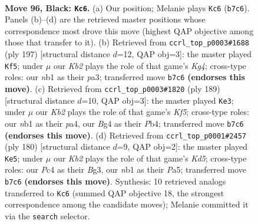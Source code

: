 \documentclass[11pt]{article}
\begin{document}
\clearpage

\begin{figure}[p]\centering
\begin{subfigure}{0.46\textwidth}\centering
\resizebox{\linewidth}{!}{%
\newchessgame
\chessboard[
  setfen={8/1k6/8/8/p1p3b1/6B1/5K2/1N6 b - - 47 96},
  showmover=false,
  pgfstyle=straightmove, color=movearrow, markmove={b7-c6}
]}
\caption{}
\end{subfigure}\hfill
\begin{subfigure}{0.46\textwidth}\centering
\resizebox{\linewidth}{!}{%
\newchessgame
\chessboard[
  setfen={8/8/3K4/p3B1k1/p7/P7/8/8 b - - 75 99},
  showmover=false,
  pgfstyle=straightmove, color=movearrow, markmove={g5-f5}
]}
\caption{}
\end{subfigure}
\\[4pt]
\begin{subfigure}{0.46\textwidth}\centering
\resizebox{\linewidth}{!}{%
\newchessgame
\chessboard[
  setfen={8/8/8/p7/Pp3k2/8/2K5/3B4 b - - 44 95},
  showmover=false,
  pgfstyle=straightmove, color=movearrow, markmove={f4-e3}
]}
\caption{}
\end{subfigure}\hfill
\begin{subfigure}{0.46\textwidth}\centering
\resizebox{\linewidth}{!}{%
\newchessgame
\chessboard[
  setfen={4b3/5k2/p4P2/P2K4/8/6B1/8/8 w - - 71 91},
  showmover=false,
  pgfstyle=straightmove, color=movearrow, markmove={d5-e5}
]}
\caption{}
\end{subfigure}
\caption{\textbf{Move 96, Black: \texttt{Kc6}.} (a) Our position; Melanie plays \texttt{Kc6} (\texttt{b7c6}). Panels (b)--(d) are the retrieved master positions whose correspondence most drove this move (highest QAP objective among those that transfer to it). (b) Retrieved from \texttt{ccrl\_top\_p0003\#1688} (ply 197) [structural distance $d$=12, QAP obj=3]: the master played \texttt{Kf5}; under $\mu$ our \emph{Kb2} plays the role of that game's \emph{Kg4}; cross-type roles: our \emph{n}b1 as their \emph{p}a3; transferred move \texttt{b7c6} \textbf{(endorses this move)}. (c) Retrieved from \texttt{ccrl\_top\_p0003\#1820} (ply 189) [structural distance $d$=10, QAP obj=3]: the master played \texttt{Ke3}; under $\mu$ our \emph{Kb2} plays the role of that game's \emph{Kf5}; cross-type roles: our \emph{n}b1 as their \emph{p}a4, our \emph{B}g4 as their \emph{P}b4; transferred move \texttt{b7c6} \textbf{(endorses this move)}. (d) Retrieved from \texttt{ccrl\_top\_p0001\#2457} (ply 180) [structural distance $d$=9, QAP obj=2]: the master played \texttt{Ke5}; under $\mu$ our \emph{Kb2} plays the role of that game's \emph{Kd5}; cross-type roles: our \emph{P}c4 as their \emph{B}g3, our \emph{n}b1 as their \emph{P}a5; transferred move \texttt{b7c6} \textbf{(endorses this move)}. Synthesis: 10 retrieved analogs transferred to \texttt{Kc6} (summed QAP objective 18, the strongest correspondence among the candidate moves); Melanie committed it via the \texttt{search} selector.}
\label{fig:thought-m191}
\end{figure}
\end{document}
